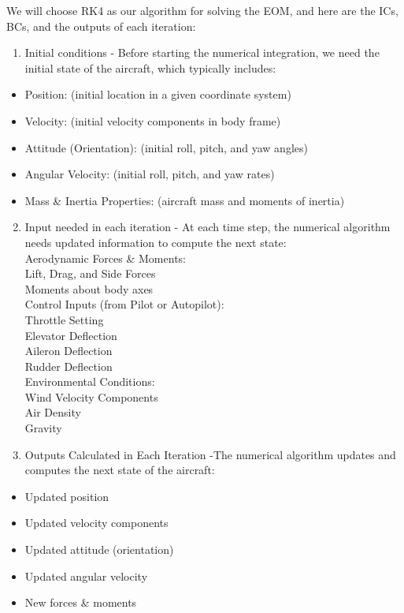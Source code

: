 \documentclass[10pt]{article}
\begin{document}
We will choose RK4 as our algorithm for solving the EOM, and here are the ICs, BCs, and the outputs of each iteration:

\begin{enumerate}
  \item Initial conditions - Before starting the numerical integration, we need the initial state of the aircraft, which typically includes:
\end{enumerate}

\begin{itemize}
  \item Position: (initial location in a given coordinate system)
  \item Velocity: (initial velocity components in body frame)
  \item Attitude (Orientation): (initial roll, pitch, and yaw angles)
  \item Angular Velocity: (initial roll, pitch, and yaw rates)
  \item Mass \& Inertia Properties: (aircraft mass and moments of inertia)
\end{itemize}

\begin{enumerate}
  \setcounter{enumi}{1}
  \item Input needed in each iteration - At each time step, the numerical algorithm needs updated information to compute the next state:\\
Aerodynamic Forces \& Moments:\\
Lift, Drag, and Side Forces\\
Moments about body axes\\
Control Inputs (from Pilot or Autopilot):\\
Throttle Setting\\
Elevator Deflection\\
Aileron Deflection\\
Rudder Deflection\\
Environmental Conditions:\\
Wind Velocity Components\\
Air Density\\
Gravity
  \item Outputs Calculated in Each Iteration -The numerical algorithm updates and computes the next state of the aircraft:
\end{enumerate}

\begin{itemize}
  \item Updated position
  \item Updated velocity components
  \item Updated attitude (orientation)
  \item Updated angular velocity
  \item New forces \& moments
\end{itemize}
\end{document}
